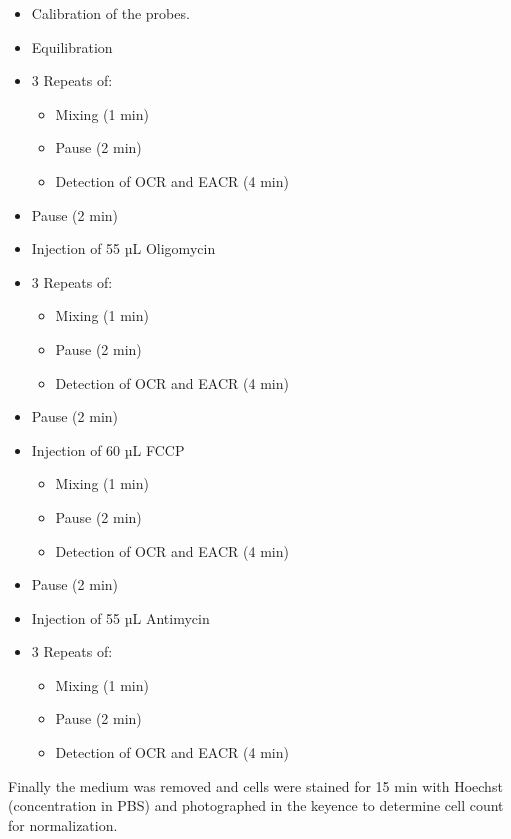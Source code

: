     \begin{itemize}
        \item Calibration of the probes.
        \item Equilibration
        \item 3 Repeats of:
        \begin{itemize}
            \item Mixing (1 min)
            \item Pause (2 min)
            \item Detection of OCR and EACR (4 min)
        \end{itemize}
        \item Pause (2 min)
        \item Injection of 55 µL Oligomycin
        \item 3 Repeats of:
        \begin{itemize}
            \item Mixing (1 min)
            \item Pause (2 min)
            \item Detection of OCR and EACR (4 min)
        \end{itemize}
        \item Pause (2 min)
        \item Injection of 60 µL FCCP
        \begin{itemize}
            \item Mixing (1 min)
            \item Pause (2 min)
            \item Detection of OCR and EACR (4 min)
        \end{itemize}
        \item Pause (2 min)
        \item Injection of 55 µL Antimycin
        \item 3 Repeats of:
        \begin{itemize}
            \item Mixing (1 min)
            \item Pause (2 min)
            \item Detection of OCR and EACR (4 min)
        \end{itemize}
    \end{itemize}

    Finally the medium was removed and cells were stained for 15 min with Hoechst (concentration in PBS) and photographed in the keyence to determine cell count for normalization.

